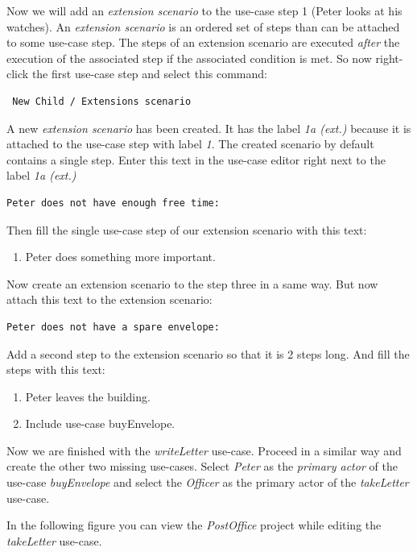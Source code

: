Now we will add an \emph{extension scenario} to the use-case step 1 (Peter looks at his watches). An \emph{extension scenario} is an
ordered set of steps than can be attached to some use-case step. The steps of an extension scenario are executed \emph{after} the execution
of the associated step if the associated condition is met. So now right-click the first use-case step and select this command:
\begin{verbatim}
 New Child / Extensions scenario
\end{verbatim}
A new \emph{extension scenario} has been created. It has the label \emph{1a (ext.)} because it is attached to the use-case step with label
\emph{1}. The created scenario by default contains a single step. Enter this text in the use-case editor right next to the label
\emph{1a (ext.)}
\begin{verbatim}
Peter does not have enough free time:
\end{verbatim}
Then fill the single use-case step of our extension scenario with this text:
\begin{enumerate}
 \item Peter does something more important.
\end{enumerate}

Now create an extension scenario to the step three in a same way. But now attach this text to the extension scenario:
\begin{verbatim}
Peter does not have a spare envelope:
\end{verbatim}

Add a second step to the extension scenario so that it is 2 steps long. And fill the steps with this text:
\begin {enumerate}
 \item Peter leaves the building.
 \item Include use-case buyEnvelope.
\end {enumerate}

Now we are finished with the \emph{writeLetter} use-case. Proceed in a similar way and create the other two missing use-cases.
Select \emph{Peter} as the \emph{primary actor} of the use-case \emph{buyEnvelope} and select the \emph{Officer} as the primary actor
of the \emph{takeLetter} use-case.

In the following figure you can view the \emph{PostOffice} project while editing the \emph{takeLetter} use-case.

